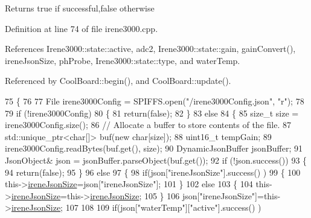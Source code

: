 \begin{DoxyReturn}{Returns}
true if successful,false otherwise 
\end{DoxyReturn}


Definition at line 74 of file irene3000.\+cpp.



References Irene3000\+::state\+::active, adc2, Irene3000\+::state\+::gain, gain\+Convert(), irene\+Json\+Size, ph\+Probe, Irene3000\+::state\+::type, and water\+Temp.



Referenced by Cool\+Board\+::begin(), and Cool\+Board\+::update().


\begin{DoxyCode}
75 \{
76 
77     File irene3000Config = SPIFFS.open(\textcolor{stringliteral}{"/irene3000Config.json"}, \textcolor{stringliteral}{"r"});
78 
79     \textcolor{keywordflow}{if} (!irene3000Config) 
80     \{
81         \textcolor{keywordflow}{return}(\textcolor{keyword}{false});
82     \}
83     \textcolor{keywordflow}{else}
84     \{
85         \textcolor{keywordtype}{size\_t} size = irene3000Config.size();
86         \textcolor{comment}{// Allocate a buffer to store contents of the file.}
87         std::unique\_ptr<char[]> buf(\textcolor{keyword}{new} \textcolor{keywordtype}{char}[size]);
88             uint16\_t tempGain;
89         irene3000Config.readBytes(buf.get(), size);
90         DynamicJsonBuffer jsonBuffer;
91         JsonObject& json = jsonBuffer.parseObject(buf.get());
92         \textcolor{keywordflow}{if} (!json.success()) 
93         \{
94               \textcolor{keywordflow}{return}(\textcolor{keyword}{false});
95         \} 
96         \textcolor{keywordflow}{else}
97         \{   
98             \textcolor{keywordflow}{if}(json[\textcolor{stringliteral}{"ireneJsonSize"}].success() )
99             \{
100                 this->\hyperlink{classIrene3000_a6534710e4c81669dcc828d2c5450fabe}{ireneJsonSize}=json[\textcolor{stringliteral}{"ireneJsonSize"}];
101             \}
102             \textcolor{keywordflow}{else}
103             \{
104                 this->\hyperlink{classIrene3000_a6534710e4c81669dcc828d2c5450fabe}{ireneJsonSize}=this->\hyperlink{classIrene3000_a6534710e4c81669dcc828d2c5450fabe}{ireneJsonSize};
105             \}
106             json[\textcolor{stringliteral}{"ireneJsonSize"}]=this->\hyperlink{classIrene3000_a6534710e4c81669dcc828d2c5450fabe}{ireneJsonSize};
107 
108             
109             \textcolor{keywordflow}{if}(json[\textcolor{stringliteral}{"waterTemp"}][\textcolor{stringliteral}{"active"}].success() )

\end{DoxyCode}
